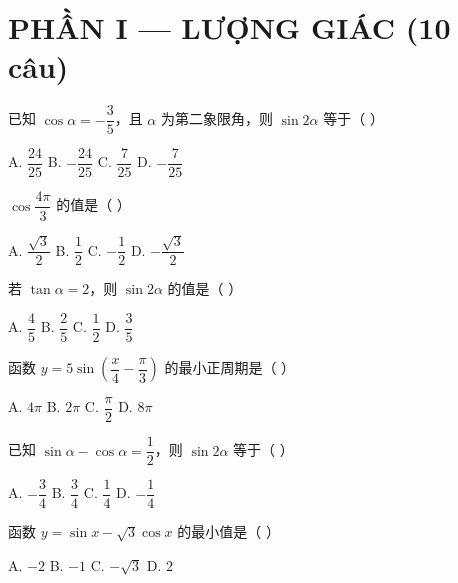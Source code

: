 \documentclass[11pt, a4paper]{article}
\begin{document}

\section{PHẦN I — LƯỢNG GIÁC (10 câu)}

\begin{baitap}[1]
已知 $\cos\alpha = -\dfrac{3}{5}$，且 $\alpha$ 为第二象限角，则 $\sin 2\alpha$ 等于（ ）
\par\vspace{3pt}
\noindent A. $\dfrac{24}{25}$ \quad B. $-\dfrac{24}{25}$ \quad C. $\dfrac{7}{25}$ \quad D. $-\dfrac{7}{25}$
\end{baitap}

\begin{baitap}[2]
$\cos\dfrac{4\pi}{3}$ 的值是（ ）
\par\vspace{3pt}
\noindent A. $\dfrac{\sqrt{3}}{2}$ \quad B. $\dfrac{1}{2}$ \quad C. $-\dfrac{1}{2}$ \quad D. $-\dfrac{\sqrt{3}}{2}$
\end{baitap}

\begin{baitap}[3]
若 $\tan\alpha = 2$，则 $\sin 2\alpha$ 的值是（ ）
\par\vspace{3pt}
\noindent A. $\dfrac{4}{5}$ \quad B. $\dfrac{2}{5}$ \quad C. $\dfrac{1}{2}$ \quad D. $\dfrac{3}{5}$
\end{baitap}

\begin{baitap}[4]
函数 $y = 5\sin\!\left(\dfrac{x}{4} - \dfrac{\pi}{3}\right)$ 的最小正周期是（ ）
\par\vspace{3pt}
\noindent A. $4\pi$ \quad B. $2\pi$ \quad C. $\dfrac{\pi}{2}$ \quad D. $8\pi$
\end{baitap}

\begin{baitap}[5]
已知 $\sin\alpha - \cos\alpha = \dfrac{1}{2}$，则 $\sin 2\alpha$ 等于（ ）
\par\vspace{3pt}
\noindent A. $-\dfrac{3}{4}$ \quad B. $\dfrac{3}{4}$ \quad C. $\dfrac{1}{4}$ \quad D. $-\dfrac{1}{4}$
\end{baitap}

\begin{baitap}[6]
函数 $y = \sin x - \sqrt{3}\cos x$ 的最小值是（ ）
\par\vspace{3pt}
\noindent A. $-2$ \quad B. $-1$ \quad C. $-\sqrt{3}$ \quad D. $2$
\end{baitap}
\end{document}

